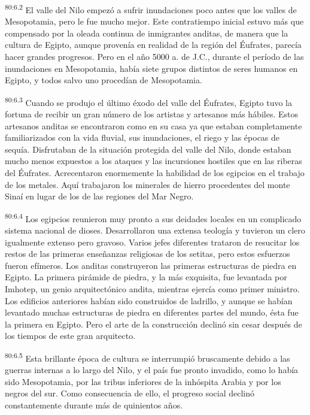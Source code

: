 \par
\textsuperscript{80:6.2} El valle del Nilo empezó a sufrir inundaciones poco antes que los valles de Mesopotamia, pero le fue mucho mejor. Este contratiempo inicial estuvo más que compensado por la oleada continua de inmigrantes anditas, de manera que la cultura de Egipto, aunque provenía en realidad de la región del Éufrates, parecía hacer grandes progresos. Pero en el año 5000 a. de J.C., durante el período de las inundaciones en Mesopotamia, había siete grupos distintos de seres humanos en Egipto, y todos salvo uno procedían de Mesopotamia.

\par
\textsuperscript{80:6.3} Cuando se produjo el último éxodo del valle del Éufrates, Egipto tuvo la fortuna de recibir un gran número de los artistas y artesanos más hábiles. Estos artesanos anditas se encontraron como en su casa ya que estaban completamente familiarizados con la vida fluvial, sus inundaciones, el riego y las épocas de sequía. Disfrutaban de la situación protegida del valle del Nilo, donde estaban mucho menos expuestos a los ataques y las incursiones hostiles que en las riberas del Éufrates. Acrecentaron enormemente la habilidad de los egipcios en el trabajo de los metales. Aquí trabajaron los minerales de hierro procedentes del monte Sinaí en lugar de los de las regiones del Mar Negro.

\par
\textsuperscript{80:6.4} Los egipcios reunieron muy pronto a sus deidades locales en un complicado sistema nacional de dioses. Desarrollaron una extensa teología y tuvieron un clero igualmente extenso pero gravoso. Varios jefes diferentes trataron de resucitar los restos de las primeras enseñanzas religiosas de los setitas, pero estos esfuerzos fueron efímeros. Los anditas construyeron las primeras estructuras de piedra en Egipto. La primera pirámide de piedra, y la más exquisita, fue levantada por Imhotep, un genio arquitectónico andita, mientras ejercía como primer ministro. Los edificios anteriores habían sido construidos de ladrillo, y aunque se habían levantado muchas estructuras de piedra en diferentes partes del mundo, ésta fue la primera en Egipto. Pero el arte de la construcción declinó sin cesar después de los tiempos de este gran arquitecto.

\par
\textsuperscript{80:6.5} Esta brillante época de cultura se interrumpió bruscamente debido a las guerras internas a lo largo del Nilo, y el país fue pronto invadido, como lo había sido Mesopotamia, por las tribus inferiores de la inhóspita Arabia y por los negros del sur. Como consecuencia de ello, el progreso social declinó constantemente durante más de quinientos años.

